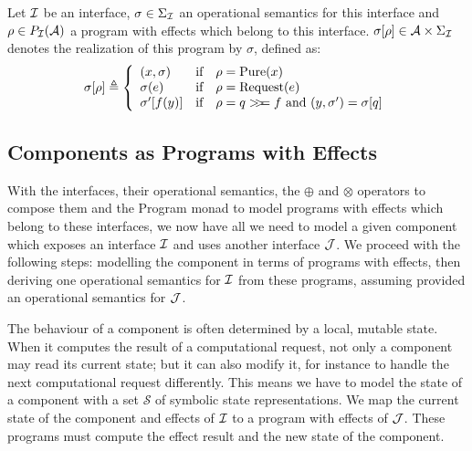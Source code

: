 \begin{definition} \label{def:freespec:realisation} Let $\mathcal{I}$ be an interface,
  $\sigma \in \Sigma_{\mathcal{I}}$ an operational semantics for this interface and
  $\rho \in P_{\mathcal{I}}(\mathcal{A})$ a program with effects which belong to this
  interface.
  $\sigma[\rho] \in \mathcal{A} \times \Sigma_{\mathcal{I}}$ denotes the realization of
  this program by $\sigma$, defined as:
  \[ \sigma[\rho] \triangleq \left\{
      \begin{array}{lcl} (x, \sigma) & \text{if} & \rho =
                                                   \mathrm{Pure}(x) \\
        \sigma(e) & \text{if} & \rho =
                                \mathrm{Request}(e) \\
        \sigma'[f(y)] & \text{if} & \rho =
                                    q >\!\!>\!\!= f\text{ and }(y, \sigma') = \sigma[q] \\
      \end{array}
    \right.
  \]
\end{definition}

\subsection{Components as Programs with Effects}

With the interfaces, their operational semantics, the $\oplus$ and $\otimes$
operators to compose them and the Program monad to model programs with effects
which belong to these interfaces, we now have all we need to model a given
component which exposes an interface $\mathcal{I}$ and uses another interface $\mathcal{J}$.
%
We proceed with the following steps: modelling the component in terms of
programs with effects, then deriving one operational semantics for $\mathcal{I}$ from
these programs, assuming provided an operational semantics for $\mathcal{J}$.

The behaviour of a component is often determined by a local, mutable state.
%
When it computes the result of a computational request, not only a component may
read its current state; but it can also modify it, for instance to handle the
next computational request differently.
%
This means we have to model the state of a component with a set $\mathcal{S}$ of
symbolic state representations.
%
We map the current state of the component and effects of $\mathcal{I}$ to a program with
effects of $\mathcal{J}$.
%
These programs must compute the effect result and the new state of the
component.

